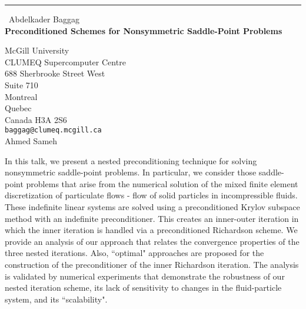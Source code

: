 \documentclass{report}
\begin{document}
\begin{center}
\rule{6in}{1pt} \
{\large Abdelkader Baggag \\
{\bf Preconditioned Schemes for Nonsymmetric Saddle-Point Problems}}

McGill University \\ CLUMEQ Supercomputer Centre \\ 688 Sherbrooke Street West \\ Suite 710 \\ Montreal \\ Quebec \\ Canada H3A 2S6
\\
{\tt baggag@clumeq.mcgill.ca}\\
Ahmed Sameh\end{center}

In this talk, we present a nested preconditioning technique for solving
nonsymmetric saddle-point problems. In particular, we consider those
saddle-point problems that arise from the numerical solution of the mixed
finite element discretization of particulate flows - flow of solid
particles in incompressible fluids.
These indefinite linear systems are solved using a preconditioned Krylov
subspace method with an indefinite preconditioner. This
creates an inner-outer iteration in which the inner iteration is handled
via a preconditioned Richardson scheme.
We provide an analysis of our approach that relates the convergence
properties of the three nested iterations. Also, ``optimal" approaches
are proposed for the construction of the preconditioner
of the inner Richardson iteration.
The analysis is validated by numerical experiments that demonstrate the
robustness of our nested iteration scheme, its lack of sensitivity to
changes in the fluid-particle system, and its
``scalability".
\end{document}
